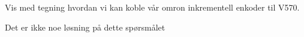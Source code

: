 

Vis med tegning hvordan vi kan koble v{\aa}r omron inkrementell enkoder til V570. 








Det er ikke noe l{\o}sning p{\aa} dette sp{\o}rsm{\aa}let













